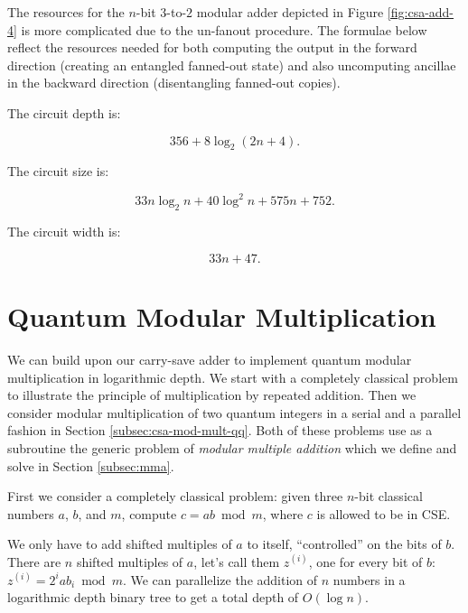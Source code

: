 \documentclass[twoside]{article}
\begin{document}
The resources for the $n$-bit $3$-to-$2$ modular adder depicted in Figure
\ref{fig:csa-add-4} is more complicated due to the un-fanout procedure.
The formulae below reflect the resources needed for both computing the output
in the forward direction (creating an entangled fanned-out state)
and also uncomputing ancillae in the backward
direction (disentangling fanned-out copies).

The circuit depth is:

\begin{equation}
356 + 8\log_2(2n+4)\text{.}
\end{equation}

The circuit size is:

\begin{equation}
33n\log_2 n + 40\log^2 n + 575n + 752\text{.}
\end{equation}

The circuit width is:

\begin{equation}
33n + 47\text{.}
\end{equation}

%
\section{Quantum Modular Multiplication}
\label{sec:csa-mod-mult}

We can build upon our carry-save adder to implement quantum modular
multiplication in logarithmic depth. We start with a completely classical
problem to illustrate the principle of multiplication by repeated addition.
Then we consider modular multiplication of two quantum integers in a serial
and a parallel fashion in Section
\ref{subsec:csa-mod-mult-qq}. Both of these problems use as a subroutine the
generic problem of \emph{modular multiple addition} which we define and solve
in Section \ref{subsec:mma}.

First we consider a completely classical problem:
given three $n$-bit classical numbers $a$, $b$, and $m$,
compute $c = ab \bmod m$, where $c$ is allowed to be in CSE.

We only have to add shifted
multiples of $a$ to itself, ``controlled'' on the bits of $b$. There are
$n$ shifted multiples of $a$, let's call them $z^{(i)}$, one for every bit of $b$:
$z^{(i)} = 2^i a b_i \bmod m$.
We can parallelize the addition of $n$ numbers in a logarithmic depth
binary tree to get a total depth of $O(\log n)$.
\end{document}

